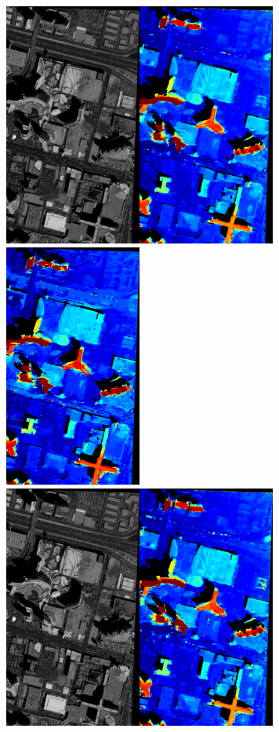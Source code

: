 \documentclass{article}
\theoremstyle{definition}
\begin{document}
\begin{figure}[ht]
 \centering
 \includegraphics[height=8cm]{images/SkysatLR18_240_img/1521805051081_dmap_050.png}\hspace{-0.28em}
 \includegraphics[height=8cm]{images/SkysatHR18_240/1521744514157_dmap_050.png}\\
 \vspace{1em}
 \includegraphics[height=8cm]{images/SkysatLR18_240_img/1521805051081_dmap_025.png}\hspace{-0.28em}

\end{figure}
\end{document}
